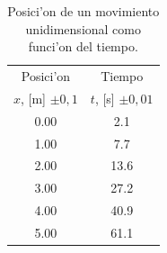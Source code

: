 \begin{table}[h!]
\begin{center}
\begin{tabular}{|c|c|}
\hline 
Posici'on & Tiempo \\ 
$x$, [m] $\pm 0,1$ & $t$, [s] $\pm 0,01$ \\ \hline
0.00 & 2.1 \\ \hline
1.00 & 7.7 \\ \hline
2.00 & 13.6\\ \hline
3.00 & 27.2\\ \hline
4.00 & 40.9\\ \hline
5.00 & 61.1\\ \hline
\end{tabular}
\caption{Posici'on de un movimiento unidimensional como funci'on del tiempo.}
\label{tab-xt}
\end{center}
\end{table}

